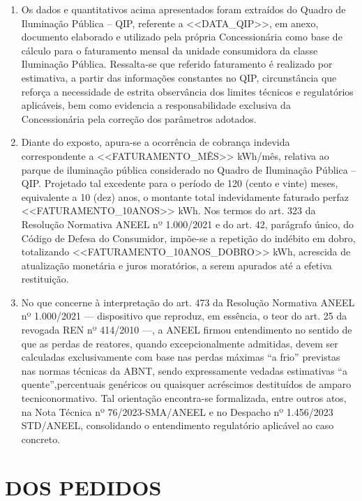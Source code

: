 \begin{enumerate}[resume]
\item
Os dados e quantitativos acima apresentados foram extraídos do Quadro de Iluminação Pública – QIP, referente a <<DATA_QIP>>, em anexo, documento elaborado e utilizado pela própria Concessionária como base de cálculo para o faturamento mensal da unidade consumidora da classe Iluminação Pública. Ressalta-se que referido faturamento é realizado por estimativa, a partir das informações constantes no QIP, circunstância que reforça a necessidade de estrita observância dos limites técnicos e regulatórios aplicáveis, bem como evidencia a responsabilidade exclusiva da Concessionária pela correção dos parâmetros adotados.

\item
Diante do exposto, apura-se a ocorrência de cobrança indevida correspondente a <<FATURAMENTO_MÊS>> kWh/mês, relativa ao parque de iluminação pública considerado no Quadro de Iluminação Pública – QIP. Projetado tal excedente para o período de 120 (cento e vinte) meses, equivalente a 10 (dez) anos, o montante total indevidamente faturado perfaz <<FATURAMENTO_10ANOS>> kWh. Nos termos do art. 323 da Resolução Normativa ANEEL nº 1.000/2021 e do art. 42, parágrafo único, do Código de Defesa do Consumidor, impõe-se a repetição do indébito em dobro, totalizando <<FATURAMENTO_10ANOS_DOBRO>> kWh, acrescida de atualização monetária e juros moratórios, a serem apurados até a efetiva restituição.

\item
No que concerne à interpretação do art. 473 da Resolução Normativa ANEEL nº 1.000/2021 — dispositivo que reproduz, em essência, o teor do art. 25 da revogada REN nº 414/2010 —, a ANEEL firmou entendimento no sentido de que as perdas de reatores, quando excepcionalmente admitidas, devem ser calculadas exclusivamente com base nas perdas máximas “a frio” previstas nas normas técnicas da ABNT, sendo expressamente vedadas estimativas “a quente”,percentuais genéricos ou quaisquer acréscimos destituídos de amparo tecniconormativo. Tal orientação encontra-se formalizada, entre outros atos, na Nota Técnica nº 76/2023-SMA/ANEEL e no Despacho nº 1.456/2023 STD/ANEEL, consolidando o entendimento regulatório aplicável ao caso concreto.
\end{enumerate}

\section{DOS PEDIDOS}

